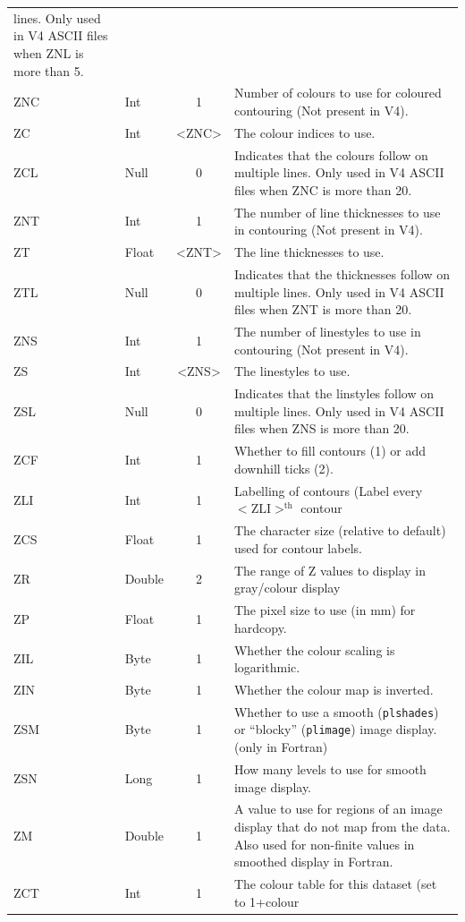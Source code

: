 \documentclass[english]{article}
\begin{document}
\begin{longtable}{|llcp{8cm}|}
  lines. Only used in V4 ASCII files when ZNL is more than 5.\\
  ZNC& Int& 1&
  Number of colours to use for coloured contouring (Not present in V4).\\
  ZC& Int& <ZNC>&
  The colour indices to use.\\
  ZCL & Null & 0 & Indicates that the colours follow on multiple
  lines. Only used in V4 ASCII files when ZNC is more than 20.\\
  ZNT& Int & 1&
  The number of line thicknesses to use in contouring (Not present in V4).\\
  ZT& Float& <ZNT>&
  The line thicknesses to use.\\
  ZTL & Null & 0 & Indicates that the thicknesses follow on multiple
  lines. Only used in V4 ASCII files when ZNT is more than 20.\\
  ZNS& Int& 1&
  The number of linestyles to use in contouring (Not present in V4).\\
  ZS& Int& <ZNS>&
  The linestyles to use.\\
  ZSL & Null & 0 & Indicates that the linstyles follow on multiple
  lines. Only used in V4 ASCII files when ZNS is more than 20.\\
  ZCF& Int& 1&
  Whether to fill contours (1) or add downhill ticks (2).\\
  ZLI& Int& 1&
  Labelling of contours (Label every $\mathrm{<ZLI>^{th}}$ contour\\
  ZCS & Float & 1 & The character size (relative to default) used for
  contour labels.\\
  ZR& Double& 2&
  The range of Z values to display in gray/colour display\\
  ZP& Float& 1&
  The pixel size to use (in mm) for hardcopy.\\
  ZIL & Byte & 1 & Whether the colour scaling is logarithmic.\\
  ZIN & Byte & 1 & Whether the colour map is inverted.\\
  ZSM & Byte & 1 & Whether to use a smooth (\texttt{plshades}) or
  ``blocky'' (\texttt{plimage}) image display. (only in Fortran)\\
  ZSN & Long & 1 & How many levels to use for smooth image display.\\
  ZM & Double & 1 & A value to use for regions of an image display that
  do not map from the data. Also used for non-finite values in smoothed
  display in Fortran.\\
  ZCT & Int & 1 & The colour table for this dataset (set to 1+colour

\end{longtable}
\end{document}
